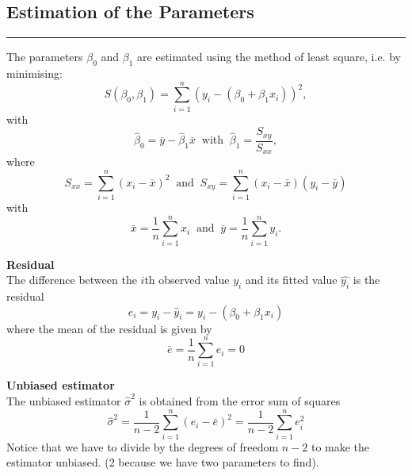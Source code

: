 \subsection{Estimation of the Parameters}
\noindent\rule[\linienAbstand]{\linewidth}{\linienDicke}
The parameters $\beta_0$ and $\beta_1$ are estimated using the method of least square, i.e. by minimising:
\begin{equation}
  S(\beta_0, \beta_1) = \sum_{i=1}^n(y_i-(\beta_0 + \beta_1x_i))^2,
\end{equation}
with
\begin{equation}
  \hat{\beta}_0 = \bar{y} - \hat{\beta}_1\bar{x} \;\;\text{with}\;\; \hat{\beta}_1 = \frac{S_{xy}}{S_{xx}},
\end{equation}
where
\begin{equation}
  S_{xx} =  \sum^n_{i=1}(x_i - \bar{x})^2 \;\;\text{and}\;\; S_{xy} =  \sum^n_{i=1}(x_i - \bar{x})(y_i - \bar{y})
\end{equation}
with
\begin{equation}
  \bar{x} = \frac{1}{n}\sum_{i=1}^n x_i  \;\;\text{and}\;\; \bar{y} = \frac{1}{n}\sum_{i=1}^n y_i.
\end{equation}

\textbf{Residual}\\
The difference between the $i$th observed value $y_i$ and its fitted value $\hat{y_i}$ is the residual
\begin{equation}
  e_i = y_i - \hat{y}_i = y_i - (\beta_0 + \beta_1x_i)
\end{equation}
where the mean of the residual is given by
\begin{equation}
  \bar{e} = \frac{1}{n} \sum_{i=1}^n e_i = 0
\end{equation}

\textbf{Unbiased estimator}\\
The unbiased estimator $\hat{\sigma}^2$  is obtained from the error sum of squares
\begin{equation}
  \hat{\sigma}^2 = \frac{1}{n - 2} \sum_{i=1}^n (e_i - \bar{e})^2 = \frac{1}{n - 2} \sum_{i=1}^n e_i^2
  \label{eq:7.2.h}
\end{equation}
Notice that we have to divide by the degrees of freedom $n - 2$ to make the estimator unbiased. (2 because we have two parameters to find).\\


